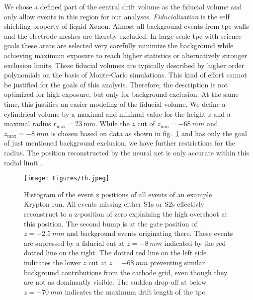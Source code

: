 We chose a defined part of the central drift volume as the fiducial volume and only allow events in this region for our analyses.
\emph{Fiducialization} is the self shielding property of liquid Xenon.
Almost all background events from \gls{tpc} walls and the electrode meshes are thereby excluded.
In large scale \gls{tpc} with science goals these areas are selected very carefully minimize the background while achieving maximum exposure to reach higher statistics or alternatively stronger exclusion limits.
These fiducial volumes are typically described by higher order polynomials on the basis of Monte-Carlo simulations.
This kind of effort cannot be justified for the goals of this analysis.
Therefore, the description is not optimized for high exposure, but only for background exclusion.
At the same time, this justifies an easier modeling of the fiducial volume.
We define a cylindrical volume by a maximal and minimal value for the height $z$ and a maximal radius $r_\mathrm{max} = \SI{23}{\milli\m}$.
While the $z$ cut of $z_\mathrm{min}= \SI{-68}{mm}$ and $z_\mathrm{max}= \SI{-8}{mm}$ is chosen based on data as shown in fig.~\ref{fig:fid-z-cut}  and has only the goal of just mentioned background exclusion, we have further restrictions for the radius.
The position reconstructed by the neural net is only accurate within this radial limit \cite{ABism}.


\begin{figure}
\centering
\texttt{[image: Figures/th.jpeg]}  %
    \caption[Fiducial z-cut]{Histogram of the event z positions of all events of an example Krypton run.
                             All events missing either S1s or S2s effectivly reconstruct to a z-position of zero explaining the high overshoot at this position.
                             The second bump is at the gate position of $ z = \SI{-2.5}{mm}$ and background events originating there.
                             These events are supressed by a fiducial cut at $ z = \SI{-8}{mm}$ indicated by the red dotted line on the right.
                             The dotted red line on the left side indicates the lower $z$ cut at $ z = \SI{-68}{mm}$ preventing similar background contributions from the cathode grid,
                             even though they are not as dominantly visible.
                             The sudden drop-off at below $ z = \SI{-70}{mm}$ indicates the maximum drift length of the \gls{tpc}.
                             }
\label{fig:fid-z-cut}
\end{figure}


